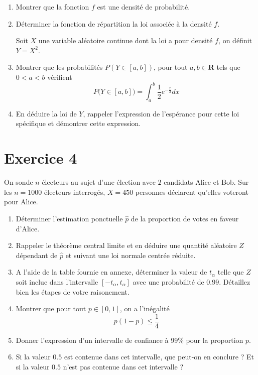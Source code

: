 \documentclass[10pt]{article}
\begin{document}
\begin{enumerate}
    \item Montrer que la fonction $f$ est une densité de probabilité.
    \item Déterminer la fonction de répartition la loi associée à la densité $f$.
    \vspace{1em}

    Soit $X$ une variable aléatoire continue dont la loi a pour densité $f$, on définit $Y=X^2$.

    \item Montrer que les probabilités $P(Y \in[a, b])$, pour tout $a, b \in \mathbf{R}$ tels que $0 < a < b$ vérifient 
        $$
        P\big(Y \in[a, b]\big)=\int_a^b \frac{1}{2} e^{-\frac{x}{2}} d x
        $$

    \item En déduire la loi de $Y$, rappeler l'expression de l'espérance pour cette loi spécifique et démontrer cette expression.

\end{enumerate}

\vspace{1em}
\section*{Exercice 4}
On sonde $n$ électeurs au sujet d'une élection avec $2$ candidats Alice et Bob. \newline
Sur les $n = 1000$ électeurs interrogés, $X = 450$ personnes déclarent qu'elles voteront pour Alice.

\begin{enumerate}
    \item Déterminer l'estimation ponctuelle $\hat{p}$ de la proportion de votes en faveur d'Alice.
   
    \item Rappeler le théorème central limite et en déduire une quantité aléatoire $Z$ dépendant de $\hat{p}$ et suivant une loi normale centrée réduite.
    \item A l'aide de la table fournie en annexe, déterminer la valeur de $t_\alpha$ telle que $Z$ soit inclue dans l'intervalle $[-t_\alpha,t_\alpha]$ avec une probabilité de $0.99$. Détaillez bien les étapes de votre raisonement.

    \item Montrer que pour tout $p \in [0, 1]$, on a l'inégalité 
    \[
    p(1-p) \leq \frac{1}{4}
    \]
    \item Donner l'expression d'un intervalle de confiance à 99\% pour la proportion $p$. 
    
    \item Si la valeur $0.5$ est contenue dans cet intervalle, que peut-on en conclure ?\newline 
    Et si la valeur $0.5$ n'est pas contenue dans cet intervalle ?
\end{enumerate}
\end{document}
